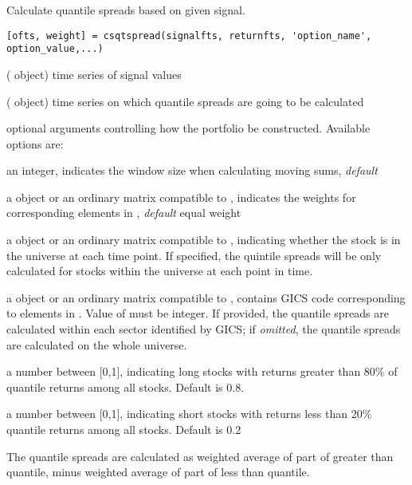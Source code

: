     Calculate quantile spreads based on given signal.

\usage
   \begin{lstlisting}[numbers=none]
   [ofts, weight] = csqtspread(signalfts, returnfts, 'option_name', option_value,...)
   \end{lstlisting}

\inarg
   \begin{argdesc}
	   \item[signalfts] (\myfints{} object) time series of signal values
	   \item[reutrnfts] (\myfints{} object) time series on which quantile
	                  spreads are going to be calculated
	   \item['option\_name', option\_value,...] optional arguments controlling
	                  how the portfolio be constructed.
                     Available options are:
		\begin{argdesc}
			  \item[window] an integer, indicates the window size when calculating
			               moving sums, \emph{default} 
			  \item[weight] a \myfints{} object or an ordinary matrix compatible to ,
			               indicates the weights for corresponding elements in ,
			              \emph{default} equal weight
		     \item[univ] a \myfints{} object or an ordinary matrix compatible to , 
                     indicating
		               whether the stock is in the universe at each time point.
		               If specified, the quintile spreads will be
		               only calculated for stocks within the universe at each point in time. 
			  \item[GICS] a \myfints{} object or an ordinary matrix compatible to ,
			             contains GICS code corresponding to elements in .
                      Value of  must be integer.
                      If provided, the quantile spreads are calculated within each sector identified by GICS;
			             if \emph{omitted}, the quantile spreads are calculated on the whole universe.
           \item[level] 
		     \item[long] a number between [0,1], indicating long stocks
                     with returns greater than 80\% of quantile returns among all stocks. 
                     Default is 0.8.
		     \item[short] a number between [0,1], indicating short stocks
                     with returns less than 20\% quantile returns among all stocks. 
                     Default is 0.2
	   \end{argdesc}	
%
	   The quantile spreads are calculated as weighted average of part of
	    greater than  quantile, minus weighted average of
	   part of  less than  quantile. 
     

\end{argdesc}
